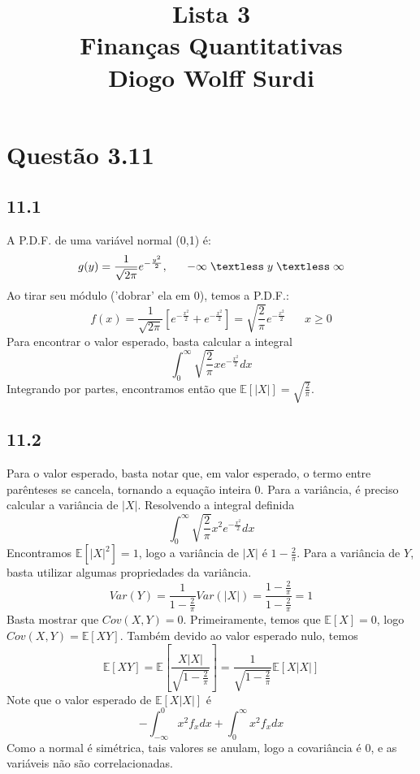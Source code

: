 \documentclass[12pt]{article}
\title{Lista 3\\
Finanças Quantitativas\\
Diogo Wolff Surdi}
\begin{document}
\maketitle

\section*{Questão 3.11}

\subsection*{11.1}
A P.D.F. de uma variável normal (0,1) é:
\begin{equation*}
g(y)=\frac{1}{\sqrt{2\pi}}e^{-\frac{y^2}{2}}, \;\;\;\;\;\; -\infty\;\textless \;y\;\textless \;\infty
\end{equation*}
Ao tirar seu módulo ('dobrar' ela em 0), temos a P.D.F.:
\begin{equation*}
f(x)=\frac{1}{\sqrt{2\pi}}[e^{-\frac{x^2}{2}}+e^{-\frac{x^2}{2}}]=\sqrt{\frac{2}{\pi}}e^{-\frac{x^2}{2}}
\;\;\;\;\;\; x\geq 0
\end{equation*}
Para encontrar o valor esperado, basta calcular a integral
\begin{equation*}
\int_{0}^{\infty}\sqrt{\frac{2}{\pi}}xe^{-\frac{x^2}{2}}dx
\end{equation*}
Integrando por partes, encontramos então que $\mathbb{E}[|X|]=\sqrt{\frac{2}{\pi}}$.

\subsection*{11.2}
Para o valor esperado, basta notar que, em valor esperado, o termo entre parênteses se cancela, tornando a equação inteira 0. Para a variância, é preciso calcular a variância de $|X|$. Resolvendo a integral definida
\begin{equation*}
\int_{0}^{\infty}\sqrt{\frac{2}{\pi}}x^2e^{-\frac{x^2}{2}}dx
\end{equation*}
Encontramos $\mathbb{E}[|X|^2]=1$, logo a variância de $|X|$ é $1-\frac{2}{\pi}$. Para a variância de $Y$, basta utilizar algumas propriedades da variância.
\begin{equation*}
Var(Y)=\frac{1}{1-\frac{2}{\pi}}Var(|X|)=\frac{1-\frac{2}{\pi}}{1-\frac{2}{\pi}}=1
\end{equation*}
Basta mostrar que $Cov(X,Y)=0$. Primeiramente, temos que $\mathbb{E}[X]=0$, logo $Cov(X,Y)=\mathbb{E}[XY]$. Também devido ao valor esperado nulo, temos 
\begin{equation*}
\mathbb{E}[XY]=\mathbb{E}\left[\frac{X|X|}{\sqrt{1-\frac{2}{\pi}}}\right]=\frac{1}{\sqrt{1-\frac{2}{\pi}}}\mathbb{E}[X|X|]
\end{equation*}
Note que o valor esperado de $\mathbb{E}[X|X|]$ é
\begin{equation*}
-\int_{-\infty}^{0}x^2f_{x}dx+\int_{0}^{\infty}x^2f_{x}dx
\end{equation*}
Como a normal é simétrica, tais valores se anulam, logo a covariância é 0, e as variáveis não são correlacionadas.
\end{document}
